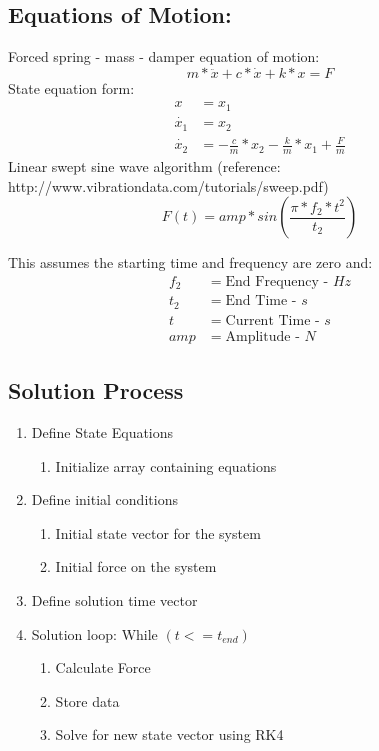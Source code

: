 \documentclass [a4paper, 12pt]{article}
\begin{document}
\subsection *{Equations of Motion:}
Forced spring - mass - damper equation of  motion:
\begin{equation*}
	m*\ddot{x} + c*\dot{x} +k*x = F	
\end{equation*}
State equation form:
\begin{align*}
	x &= x_1\\
	\dot{x_1} &= x_2\\
	\dot{x_2} &= -\frac{c}{m}*x_2 -\frac{k}{m} * x_1 + \frac{F}{m}
\end{align*}
Linear swept sine wave algorithm (reference: http://www.vibrationdata.com/tutorials/sweep.pdf)
\begin{equation*}
	F(t) = amp * sin(\frac{\pi*f_2*t^2}{t_2})
\end{equation*}

This assumes the starting time and frequency are zero and:
\begin{align*}
	f_2 &= \text{End Frequency - } Hz\\
	t_2 &= \text{End Time - } s\\
	t &= \text{Current Time - } s\\
	amp &= \text{Amplitude - } N
\end{align*}

\subsection *{Solution Process}
\begin{enumerate}
	\item Define State Equations
	\begin{enumerate}
		\item Initialize array containing equations
	\end{enumerate}
	\item Define initial conditions
	\begin{enumerate}
		\item Initial state vector for the system
		\item Initial force on the system
	\end{enumerate}
	\item Define solution time vector
	\item Solution loop: While $(t <= t_{end})$
	\begin{enumerate}
		\item Calculate Force
		\item Store data		
		\item Solve for new state vector using RK4		
	\end{enumerate}
	
\end{enumerate}
\end{document}
